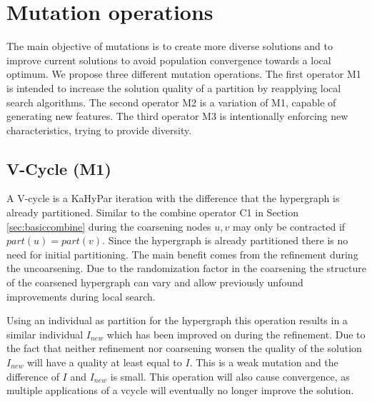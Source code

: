 \documentclass[a4paper,12pt,titlepage, BCOR7mm,headsepline]{scrbook}
\numberwithin{equation}{section}
\begin{document}
\section{Mutation operations}
The main objective of mutations is to create more diverse solutions and to improve current solutions to avoid population convergence towards a local optimum.
We propose three different mutation operations. The first operator M1 is intended to increase the solution quality of a partition by reapplying local search algorithms. The second operator M2 is a variation of M1, capable of generating new features. The third operator M3 is intentionally enforcing new characteristics, trying to provide diversity.



\subsection{V-Cycle (M1)}
\label{sec:vcycles}
A V-cycle is a KaHyPar iteration with the difference that the hypergraph is already partitioned. Similar to the combine operator C1 in Section \ref{sec:basiccombine} during the coarsening nodes $u,v$ may only be contracted if $part(u) = part(v)$. Since the hypergraph is already partitioned there is no need for initial partitioning. The main benefit comes from the refinement during the uncoarsening. Due to the randomization factor in the coarsening the structure of the coarsened hypergraph can vary and allow previously unfound improvements during local search.

Using an individual as partition for the hypergraph this operation results in a similar individual $I_{new}$ which has been improved on during the refinement. Due to the fact that neither refinement nor coarsening worsen the quality of the solution $I_{new}$ will have a quality at least equal to $I$. This is a weak mutation and the difference of $I$ and $I_{new}$ is small. This operation will also cause convergence, as multiple applications of a vcycle will eventually no longer improve the solution.
\end{document}
